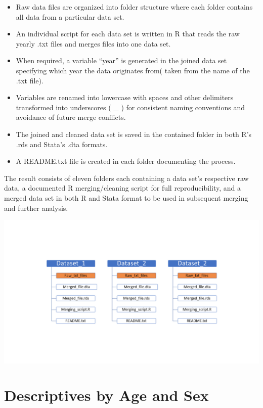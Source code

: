 \documentclass[
]{book}
\providecommand{\tightlist}{%
  \setlength{\itemsep}{0pt}\setlength{\parskip}{0pt}}
\begin{document}
\begin{itemize}
\tightlist
\item
  Raw data files are organized into folder structure where each folder contains all data from a particular data set.
\item
  An individual script for each data set is written in R that reads the raw yearly .txt files and merges files into one data set.
\item
  When required, a variable ``year'' is generated in the joined data set specifying which year the data originates from( taken from the name of the .txt file).
\item
  Variables are renamed into lowercase with spaces and other delimiters transformed into underscores ( \_ ) for consistent naming conventions and avoidance of future merge conflicts.
\item
  The joined and cleaned data set is saved in the contained folder in both R's .rds and Stata's .dta formats.
\item
  A README.txt file is created in each folder documenting the process.
\end{itemize}

The result consists of eleven folders each containing a data set's respective raw data, a documented R merging/cleaning script for full reproducibility, and a merged data set in both R and Stata format to be used in subsequent merging and further analysis.

\includegraphics[width=1\linewidth]{output/figures/folder_structure}

\hypertarget{descriptives-by-age-and-sex}{%
\chapter{Descriptives by Age and Sex}\label{descriptives-by-age-and-sex}}
\end{document}
